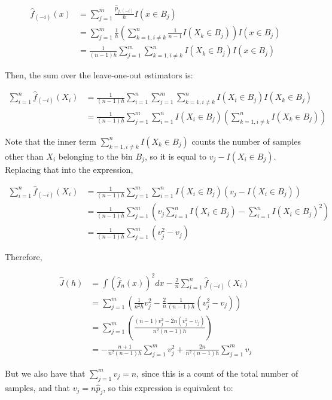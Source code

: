 \[ 
\begin{align}
\hat{f}_{(-i)}(x) &= \sum_{j=1}^m \frac{\hat{p}_{j, (-i)}}{h} I(x \in B_j) \\
&= \sum_{j=1}^m \frac{1}{h} \left( \sum_{k=1, i \neq k}^n \frac{1}{n - 1} I(X_k \in B_j) \right) I(x \in B_j) \\
&= \frac{1}{(n - 1)h} \sum_{j=1}^m \sum_{k=1, i \neq k}^n I(X_k \in B_j) I(x \in B_j)
\end{align}
\]

Then, the sum over the leave-one-out estimators is:

\[
\begin{align}
\sum_{i=1}^n \hat{f}_{(-i)}(X_i) &= \frac{1}{(n - 1)h} \sum_{i=1}^n \sum_{j=1}^m \sum_{k=1, i \neq k}^n I(X_i \in B_j) I(X_k \in B_j) \\
&= \frac{1}{(n - 1)h} \sum_{j=1}^m \sum_{i=1}^n I(X_i \in B_j)\left( \sum_{k=1, i \neq k}^n I(X_k \in B_j) \right)
\end{align}
\]

Note that the inner term \(\sum_{k=1, i \neq k}^n I(X_k \in B_j)\)
counts the number of samples other than \(X_i\) belonging to the bin
\(B_j\), so it is equal to \(v_j - I(X_i \in B_j)\). Replacing that into
the expression,

\[
\begin{align}
\sum_{i=1}^n \hat{f}_{(-i)}(X_i) &= \frac{1}{(n - 1)h} \sum_{j=1}^m \sum_{i=1}^n I(X_i \in B_j) (v_j - I(X_i \in B_j)) \\
&= \frac{1}{(n - 1)h} \sum_{j=1}^m \left( v_j \sum_{i=1}^n I(X_i \in B_j) - \sum_{i=1}^n I(X_i \in B_j)^2 \right) \\
&= \frac{1}{(n - 1)h} \sum_{j=1}^m \left( v_j^2 - v_j \right)
\end{align}
\]

Therefore,

\[
\begin{align}
\hat{J}(h) &= \int \left( \hat{f}_n(x) \right)^2 dx - \frac{2}{n} \sum_{i=1}^n \hat{f}_{(-i)}(X_i) \\
&= \sum_{j=1}^m \left( \frac{1}{n^2h} v_j^2 - \frac{2}{n} \frac{1}{(n - 1)h} \left( v_j^2 - v_j \right) \right)\\
&= \sum_{j=1}^m \left( \frac{(n - 1) v_j^2 - 2n(v_j^2 - v_j)}{n^2(n - 1)h} \right) \\
&= - \frac{n+1}{n^2(n - 1)h} \sum_{j=1}^m v_j^2 + \frac{2n}{n^2(n - 1)h} \sum_{j=1}^m v_j
\end{align}
\]

But we also have that \(\sum_{j=1}^m v_j = n\), since this is a count of
the total number of samples, and that \(v_j = n \hat{p}_j\), so this
expression is equivalent to:

